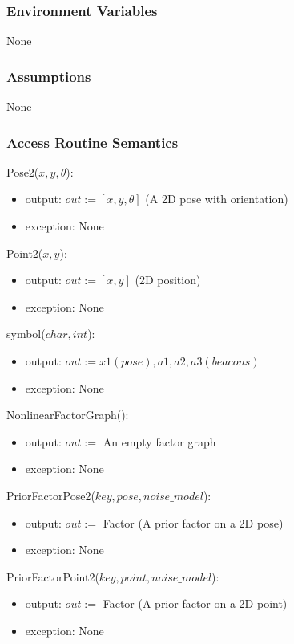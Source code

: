 \documentclass[12pt, titlepage]{article}
\begin{document}
\subsubsection{Environment Variables}
None

\subsubsection{Assumptions}
None

\subsubsection{Access Routine Semantics}

Pose2($x, y, \theta$):
\begin{itemize}
    \item output: $out:= [x, y, \theta] $ (A 2D pose with orientation)
    \item exception: None
\end{itemize}

\noindent Point2($x, y$):
\begin{itemize}
    \item output: $out:=  [x, y] $ (2D position)
    \item exception: None
\end{itemize}

\noindent symbol($char, int$):
\begin{itemize}
    \item output: $out:= x1(pose), a1, a2, a3(beacons)$
    \item exception: None
\end{itemize}

\noindent NonlinearFactorGraph():
\begin{itemize}
    \item output: $out:=$ An empty factor graph
    \item exception: None
\end{itemize}

\noindent PriorFactorPose2($key, pose, noise\_model$):
\begin{itemize}
    \item output: $out:=$ Factor (A prior factor on a 2D pose)
    \item exception: None
\end{itemize}

\noindent PriorFactorPoint2($key, point, noise\_model$):
\begin{itemize}
    \item output: $out:=$ Factor (A prior factor on a 2D point)
    \item exception: None
\end{itemize}
\end{document}
